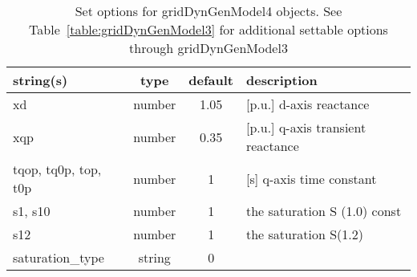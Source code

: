 \begin{table}[ht]
\centering
\begin{tabular}{p{5cm} c c p{7cm}}
\hline
string(s) & type & default & description \\
\hline
xd & number & 1.05 & [p.u.] d-axis reactance\\
xqp & number & 0.35 & [p.u.] q-axis transient reactance\\
tqop, tq0p, top, t0p & number & 1 & [s]    q-axis time constant\\
s1, s10 & number & 1 & the saturation S (1.0) const\\
s12 & number & 1 & the saturation S(1.2)\\
saturation\_type & string & 0 & \\
\hline
\end{tabular}
\caption{Set options for gridDynGenModel4 objects. See Table~\ref{table:gridDynGenModel3} for additional settable options through gridDynGenModel3}
\label{table:gridDynGenModel4}
\end{table}
